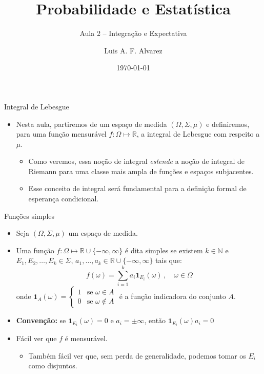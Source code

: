\documentclass[11pt]{beamer}
\author{Luis A. F. Alvarez}
\title{Probabilidade e Estatística}
\subtitle{Aula 2 -- Integração e Expectativa}
\date{\today}
\begin{document}
	
	\maketitle
\begin{frame}{Integral de Lebesgue}
	\begin{itemize}
		\item Nesta  aula, partiremos de um espaço de medida $(\Omega, \Sigma,\mu)$ e definiremos, para uma função mensurável $f: \Omega \mapsto \mathbb{R}$, a integral de Lebesgue com respeito a $\mu$.
		\begin{itemize}
			\item Como veremos, essa noção de integral \emph{estende} a noção de integral de Riemann para uma classe mais ampla de funções e espaços subjacentes.
			\item Esse conceito de integral será fundamental para a definição formal de esperança condicional.
		\end{itemize}
	\end{itemize}
\end{frame}

\begin{frame}{Funções simples}
	\begin{itemize}
	\item Seja $(\Omega, \Sigma, \mu)$ um espaço de medida.
	\item Uma função $f:\Omega \mapsto \mathbb{R} \cup \{-\infty,\infty\}$ é dita simples se existem $k \in \mathbb{N}$ e $E_1, E_2,\ldots, E_k \in \Sigma$, $a_1,\ldots, a_k \in \mathbb{R}\cup \{-\infty,\infty\}$ tais que:
		$$f(\omega) = \sum_{i=1}^k a_i \mathbf{1}_{E_i}(\omega)\, , \quad \omega \in \Omega$$
		onde $\mathbf{1}_A(\omega) = \begin{cases}
			1 & \text{se } \omega \in A \\
			0 & \text{se } \omega \notin A
		\end{cases}$ é a função indicadora do conjunto $A$.
		\item \textbf{Convenção:} se $\mathbf{1}_{E_i}(\omega) =0$ e $a_i = \pm \infty$, então $\mathbf{1}_{E_i}(\omega) a_i = 0$
		\item Fácil ver que $f$ é mensurável.
		\begin{itemize}
			\item Também fácil ver que, sem perda de generalidade, podemos tomar os $E_i$ como disjuntos.
		\end{itemize}
		
	\end{itemize}
	\end{frame}
	
\end{document}

